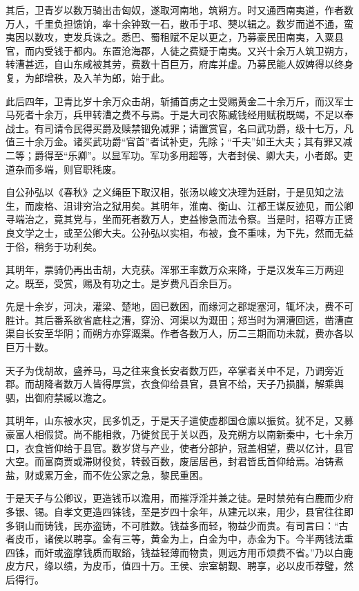 \documentclass[12pt,UTF8]{ctexbook}
\begin{document}
其后，卫青岁以数万骑出击匈奴，遂取河南地，筑朔方。时又通西南夷道，作者数万人，千里负担馈饷，率十余钟致一石，散币于邛、僰以辑之。数岁而道不通，蛮夷因以数攻，吏发兵诛之。悉巴、蜀租赋不足以更之，乃募豪民田南夷，入粟县官，而内受钱于都内。东置沧海郡，人徒之费疑于南夷。又兴十余万人筑卫朔方，转漕甚远，自山东咸被其劳，费数十百巨万，府库并虚。乃募民能人奴婢得以终身复，为郎增秩，及入羊为郎，始于此。



此后四年，卫青比岁十余万众击胡，斩捕首虏之士受赐黄金二十余万斤，而汉军士马死者十余万，兵甲转漕之费不与焉。于是大司农陈臧钱经用赋税既竭，不足以奉战士。有司请令民得买爵及赎禁锢免减罪；请置赏官，名曰武功爵，级十七万，凡值三十余万金。诸买武功爵“官首”者试补吏，先除；“千夫”如王大夫；其有罪又减二等；爵得至“乐卿”。以显军功。军功多用超等，大者封侯、卿大夫，小者郎。吏道杂而多端，则官职秏废。



自公孙弘以《春秋》之义绳臣下取汉相，张汤以峻文决理为廷尉，于是见知之法生，而废格、沮诽穷治之狱用矣。其明年，淮南、衡山、江都王谋反迹见，而公卿寻端治之，竟其党与，坐而死者数万人，吏益惨急而法令察。当是时，招尊方正贤良文学之士，或至公卿大夫。公孙弘以实相，布被，食不重味，为下先，然而无益于俗，稍务于功利矣。



其明年，票骑仍再出击胡，大克获。浑邪王率数万众来降，于是汉发车三万两迎之。既至，受赏，赐及有功之士。是岁费凡百余巨万。



先是十余岁，河决，灌梁、楚地，固已数困，而缘河之郡堤塞河，辄坏决，费不可胜计。其后番系欲省底柱之漕，穿汾、河渠以为溉田；郑当时为渭漕回远，凿漕直渠自长安至华阴；而朔方亦穿溉渠。作者各数万人，历二三期而功未就，费亦各以巨万十数。



天子为伐胡故，盛养马，马之往来食长安者数万匹，卒掌者关中不足，乃调旁近郡。而胡降者数万人皆得厚赏，衣食仰给县官，县官不给，天子乃损膳，解乘舆驷，出御府禁臧以澹之。



其明年，山东被水灾，民多饥乏，于是天子遣使虚郡国仓廪以振贫。犹不足，又募豪富人相假贷。尚不能相救，乃徙贫民于关以西，及充朔方以南新秦中，七十余万口，衣食皆仰给于县官。数岁贷与产业，使者分部护，冠盖相望，费以亿计，县官大空。而富商贾或滞财役贫，转毂百数，废居居邑，封君皆氐首仰给焉。冶铸煮盐，财或累万金，而不佐公家之急，黎民重困。



于是天子与公卿议，更造钱币以澹用，而摧浮淫并兼之徒。是时禁苑有白鹿而少府多银、锡。自孝文更造四铢钱，至是岁四十余年，从建元以来，用少，县官往往即多铜山而铸钱，民亦盗铸，不可胜数。钱益多而轻，物益少而贵。有司言曰：“古者皮币，诸侯以聘享。金有三等，黄金为上，白金为中，赤金为下。今半两钱法重四铢，而奸或盗摩钱质而取鋊，钱益轻薄而物贵，则远方用币烦费不省。”乃以白鹿皮方尺，缘以缋，为皮币，值四十万。王侯、宗室朝觐、聘享，必以皮币荐璧，然后得行。
\end{document}
